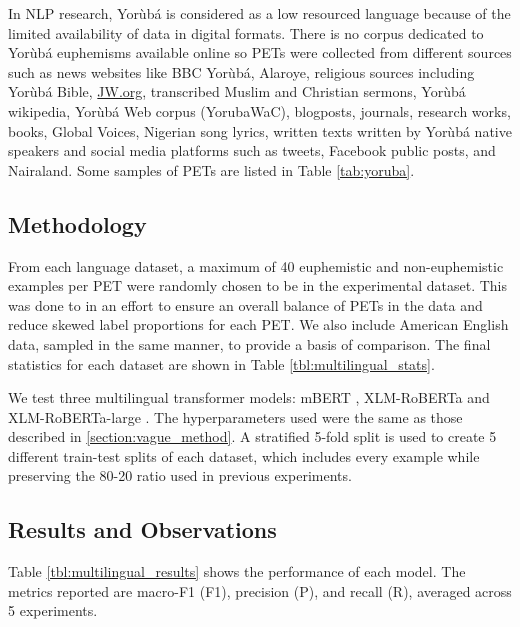 \documentclass[11pt]{article}
\begin{document}
In NLP research, {Yor\`{u}b\'{a}} is considered as a low resourced language because of the limited availability of data in digital formats. There is no corpus dedicated to {Yor\`{u}b\'{a}} euphemisms available online so PETs were collected from different sources such as news websites like BBC {Yor\`{u}b\'{a}}, Alaroye, religious sources including {Yor\`{u}b\'{a}} Bible, \url{JW.org}, transcribed Muslim and Christian sermons, {Yor\`{u}b\'{a}} wikipedia, {Yor\`{u}b\'{a}} Web corpus (YorubaWaC), blogposts, journals, research works, books, Global Voices, Nigerian song lyrics, written texts written by {Yor\`{u}b\'{a}} native speakers 
and social media platforms such as tweets, Facebook public posts, and Nairaland. Some samples of PETs are listed in Table \ref{tab:yoruba}. 

\subsection{Methodology}

From each language dataset, a maximum of 40 euphemistic and non-euphemistic examples per PET were randomly chosen to be in the experimental dataset. This was done to in an effort to ensure an overall balance of PETs in the data and reduce skewed label proportions for each PET. We also include American English data, sampled in the same manner, to provide a basis of comparison. The final statistics for each dataset are shown in Table \ref{tbl:multilingual_stats}.

 We test three multilingual transformer models: mBERT \cite{devlin2018bert},  XLM-RoBERTa and  XLM-RoBERTa-large \cite{conneau2020unsupervised}. The hyperparameters used were the same as those described in \ref{section:vague_method}. A stratified 5-fold split is used to create 5 different train-test splits of each dataset, which includes every example while preserving the 80-20 ratio used in previous experiments.

\subsection{Results and Observations}

Table \ref{tbl:multilingual_results} shows the performance of each model. The metrics reported are macro-F1 (F1), precision (P), and recall (R), averaged across 5 experiments.
\end{document}
